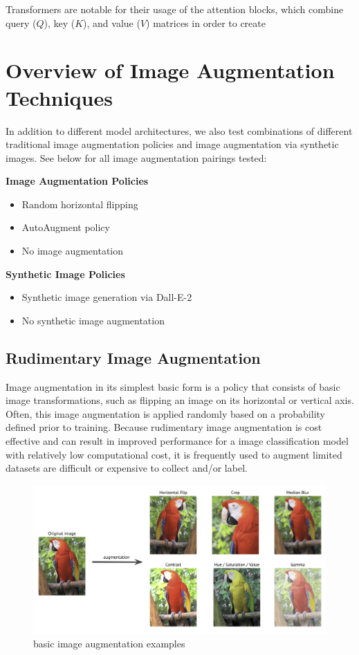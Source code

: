 \documentclass [MS] {uclathes}
\begin{document}
Transformers are notable for their usage of the attention blocks, which combine query (\(Q\)), key (\(K\)), and value 
(\(V\)) matrices in order to create 

\chapter{Overview of Image Augmentation Techniques}
In addition to different model architectures, we also test combinations of different traditional image augmentation 
policies and image augmentation via synthetic images. See below for all image augmentation pairings tested:

\begin{multicols}{2}
    \raggedcolumns
    \textbf{Image Augmentation Policies}
    \begin{itemize}
        \item Random horizontal flipping
        \item AutoAugment policy
        \item No image augmentation
    \end{itemize}
    
    \columnbreak
    
    \textbf{Synthetic Image Policies}
    \begin{itemize}
        \item Synthetic image generation via Dall-E-2
        \item No synthetic image augmentation
    \end{itemize}
\end{multicols}

\section{Rudimentary Image Augmentation}
Image augmentation in its simplest basic form is a policy that consists of basic image transformations, such as flipping
an image on its horizontal or vertical axis. Often, this image augmentation is applied randomly based on a probability 
defined prior to training. Because rudimentary image augmentation is cost effective and can result in improved 
performance for a image classification model with relatively low computational cost, it is frequently used to augment 
limited datasets are difficult or expensive to collect and/or label.

\begin{figure} [H]
    \centering
    \includegraphics[width=0.75\linewidth]{figures/basic-image-augmentation-example.png}
    \caption{basic image augmentation examples}
    \label{fig:basic image augmentation examples}
\end{figure}
\end{document}
